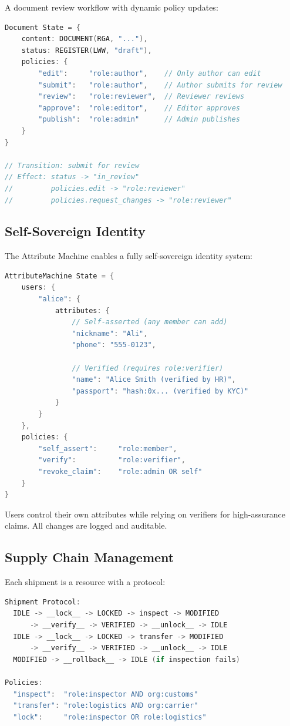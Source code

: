 \documentclass[sigconf,nonacm]{acmart}
\begin{document}
A document review workflow with dynamic policy updates:

\begin{lstlisting}[language=C]
Document State = {
    content: DOCUMENT(RGA, "..."),
    status: REGISTER(LWW, "draft"),
    policies: {
        "edit":     "role:author",    // Only author can edit
        "submit":   "role:author",    // Author submits for review
        "review":   "role:reviewer",  // Reviewer reviews
        "approve":  "role:editor",    // Editor approves
        "publish":  "role:admin"      // Admin publishes
    }
}

// Transition: submit for review
// Effect: status -> "in_review"
//         policies.edit -> "role:reviewer"
//         policies.request_changes -> "role:reviewer"
\end{lstlisting}

\subsection{Self-Sovereign Identity}

The Attribute Machine enables a fully self-sovereign identity system:

\begin{lstlisting}[language=C]
AttributeMachine State = {
    users: {
        "alice": {
            attributes: {
                // Self-asserted (any member can add)
                "nickname": "Ali",
                "phone": "555-0123",

                // Verified (requires role:verifier)
                "name": "Alice Smith (verified by HR)",
                "passport": "hash:0x... (verified by KYC)"
            }
        }
    },
    policies: {
        "self_assert":     "role:member",
        "verify":          "role:verifier",
        "revoke_claim":    "role:admin OR self"
    }
}
\end{lstlisting}

Users control their own attributes while relying on verifiers for high-assurance claims. All changes are logged and auditable.

\subsection{Supply Chain Management}

Each shipment is a resource with a protocol:

\begin{lstlisting}[language=C]
Shipment Protocol:
  IDLE -> __lock__ -> LOCKED -> inspect -> MODIFIED
      -> __verify__ -> VERIFIED -> __unlock__ -> IDLE
  IDLE -> __lock__ -> LOCKED -> transfer -> MODIFIED
      -> __verify__ -> VERIFIED -> __unlock__ -> IDLE
  MODIFIED -> __rollback__ -> IDLE (if inspection fails)

Policies:
  "inspect":  "role:inspector AND org:customs"
  "transfer": "role:logistics AND org:carrier"
  "lock":     "role:inspector OR role:logistics"
\end{lstlisting}
\end{document}
